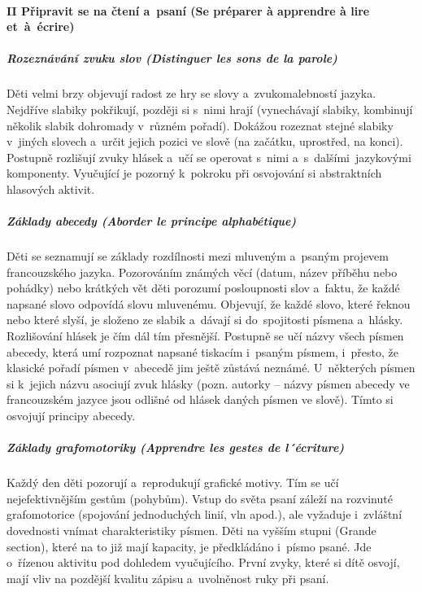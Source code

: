			\paragraph*{II Připravit se na čtení a~psaní (Se préparer à apprendre à lire\\et~à~écrire)}
				\subparagraph{Rozeznávání zvuku slov (Distinguer les sons de la parole)}
					Děti velmi brzy objevují radost ze hry se slovy a~zvukomalebností jazyka. Nejdříve slabiky pokřikují, později si s nimi hrají (vynechávají slabiky, kombinují několik slabik dohromady v různém pořadí). Dokážou rozeznat stejné slabiky v jiných slovech a~určit jejich pozici ve slově (na začátku, uprostřed, na konci).
					Postupně rozlišují zvuky hlásek a~učí se operovat s nimi a~s~dalšími jazykovými komponenty. Vyučující je pozorný k pokroku při osvojování si abstraktních hlasových aktivit.
				\subparagraph{Základy abecedy (Aborder le principe alphabétique)}
					Děti se seznamují se základy rozdílnosti mezi mluveným a~psaným projevem francouzského jazyka. Pozorováním známých věcí (datum, název příběhu nebo pohádky) nebo krátkých vět děti porozumí posloupnosti slov a~faktu, že každé napsané slovo odpovídá slovu mluvenému. 
					Objevují, že každé slovo, které řeknou nebo které slyší, je složeno ze slabik a~dávají si do spojitosti písmena a~hlásky. Rozlišování hlásek je čím dál tím přesnější. Postupně se učí názvy všech písmen abecedy, která umí rozpoznat napsané tiskacím i~psaným písmem, i~přesto, že klasické pořadí písmen v abecedě jim ještě zůstává neznámé. U~některých písmen si k~jejich názvu asociují zvuk hlásky (pozn. autorky – názvy písmen abecedy ve francouzském jazyce jsou odlišné od hlásek daných písmen ve slově). Tímto si osvojují principy abecedy.
				\subparagraph{Základy grafomotoriky (Apprendre les gestes de l´écriture)} 
					Každý den děti pozorují a~reprodukují grafické motivy. Tím se učí nejefektivnějším gestům (pohybům). Vstup do světa psaní záleží na rozvinuté grafomotorice (spojování jednoduchých linií, vln apod.), ale vyžaduje i~zvláštní dovednosti vnímat charakteristiky písmen. 
					Děti na vyšším stupni (Grande section), které na to již mají kapacity, je předkládáno i písmo psané. Jde o~řízenou aktivitu pod dohledem vyučujícího. První zvyky, které si dítě osvojí, mají vliv na pozdější kvalitu zápisu a~uvolněnost ruky při psaní. 
					
